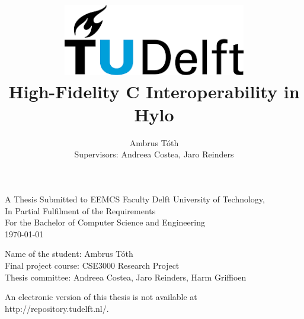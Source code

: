 \title{
    \includegraphics[width=8cm, keepaspectratio]{tudelftlogo.png}\\
    \vspace*{2cm}
    \textbf{
        {High-Fidelity C Interoperability in Hylo}
    }\\
    \vspace*{1cm}
}

\author{
    Ambrus Tóth\\
    Supervisors: Andreea Costea, Jaro Reinders
}


\date{}

\maketitle
\thispagestyle{empty}

\let\clearpagebackup\clearpage
\renewcommand{\clearpage}{ }

\onecolumn

\vspace*{1.5cm}
\begin{center}
    A Thesis Submitted to EEMCS Faculty Delft University of Technology,\\
    In Partial Fulfilment of the Requirements\\
    For the Bachelor of Computer Science and Engineering\\
    \today
\end{center}

\vspace*{2cm}

\noindent
{\small
Name of the student: Ambrus Tóth\\
Final project course: CSE3000 Research Project\\
Thesis committee: Andreea Costea, Jaro Reinders, Harm Griffioen
}
\vfill

\begin{center}
    An electronic version of this thesis is not available at http://repository.tudelft.nl/. %
\end{center}

\twocolumn
\let\clearpage\clearpagebackup  
\clearpage
\setcounter{page}{1}
